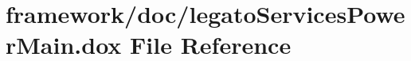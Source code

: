 \hypertarget{legato_services_power_main_8dox}{}\section{framework/doc/legato\+Services\+Power\+Main.dox File Reference}
\label{legato_services_power_main_8dox}
